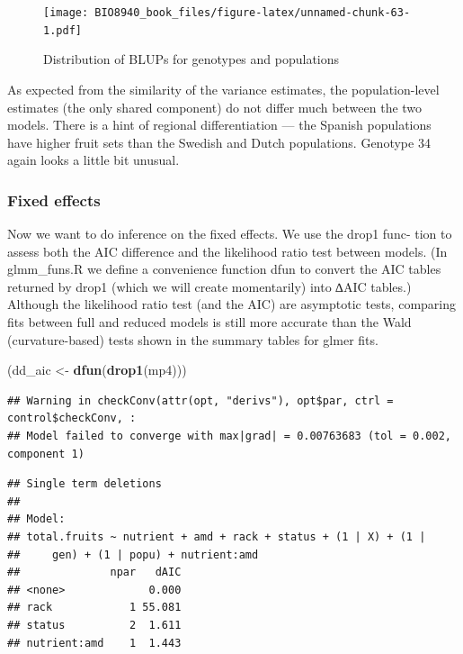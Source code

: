 \documentclass[
  12pt,
]{book}
\newenvironment{Shaded}{\begin{snugshade}}{\end{snugshade}}
\newcommand{\KeywordTok}[1]{\textcolor[rgb]{0.13,0.29,0.53}{\textbf{#1}}}
\newcommand{\NormalTok}[1]{#1}
\newcommand{\StringTok}[1]{\textcolor[rgb]{0.31,0.60,0.02}{#1}}
\begin{document}
\begin{figure}
\centering
\texttt{[image: BIO8940\_book\_files/figure-latex/unnamed-chunk-63-1.pdf]}
\caption{\label{fig:unnamed-chunk-63}Distribution of BLUPs for genotypes and populations}
\end{figure}

As expected from the similarity of the variance estimates, the population-level estimates (the only shared component) do not differ much between the two models. There is a hint of regional differentiation --- the Spanish populations have higher fruit sets than the Swedish and Dutch populations. Genotype 34 again looks a little bit unusual.

\hypertarget{fixed-effects}{%
\subsubsection{Fixed effects}\label{fixed-effects}}

Now we want to do inference on the fixed effects. We use the drop1 func- tion to assess both the AIC difference and the likelihood ratio test between models. (In glmm\_funs.R we define a convenience function dfun to convert the AIC tables returned by drop1 (which we will create momentarily) into ∆AIC tables.) Although the likelihood ratio test (and the AIC) are asymptotic tests, comparing fits between full and reduced models is still more accurate than the Wald (curvature-based) tests shown in the summary tables for glmer fits.

\begin{Shaded}
\begin{Highlighting}[]
\NormalTok{(dd_aic <-}\StringTok{ }\KeywordTok{dfun}\NormalTok{(}\KeywordTok{drop1}\NormalTok{(mp4)))}
\end{Highlighting}
\end{Shaded}

\begin{verbatim}
## Warning in checkConv(attr(opt, "derivs"), opt$par, ctrl = control$checkConv, :
## Model failed to converge with max|grad| = 0.00763683 (tol = 0.002, component 1)
\end{verbatim}

\begin{verbatim}
## Single term deletions
## 
## Model:
## total.fruits ~ nutrient + amd + rack + status + (1 | X) + (1 | 
##     gen) + (1 | popu) + nutrient:amd
##              npar   dAIC
## <none>             0.000
## rack            1 55.081
## status          2  1.611
## nutrient:amd    1  1.443
\end{verbatim}
\end{document}
